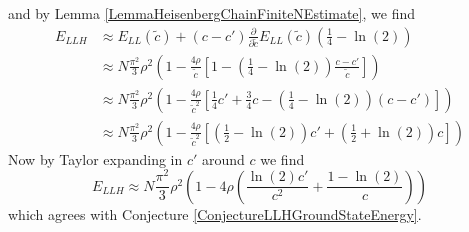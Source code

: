 and by Lemma \ref{LemmaHeisenbergChainFiniteNEstimate}, we find \begin{equation}
\begin{aligned}
E_{LLH}&\approx E_{LL}(\tilde{c})+(c-c')\frac{\partial}{\partial \tilde{c}}E_{LL}(\tilde{c})\left(\frac{1}{4}-\ln(2)\right)\\
&\approx N\frac{\pi^2}{3}\rho^2\left(1-\frac{4\rho}{\tilde{c}}\left[1-\left(\frac{1}{4}-\ln(2)\right)\frac{c-c'}{\tilde{c}}\right]\right)\\
&\approx N\frac{\pi^2}{3}\rho^2\left(1-\frac{4\rho}{\tilde{c}^2}\left[\frac{1}{4}c'+\frac{3}{4}c-\left(\frac{1}{4}-\ln(2)\right)(c-c')\right]\right)\\
&\approx N\frac{\pi^2}{3}\rho^2\left(1-\frac{4\rho}{\tilde{c}^2}\left[\left(\frac{1}{2}-\ln(2)\right)c'+\left(\frac{1}{2}+\ln(2)\right)c\right]\right)
\end{aligned}
\end{equation}
Now by Taylor expanding in $ c' $ around $ c $ we find 
\begin{equation}
	E_{LLH}\approx N\frac{\pi^2}{3}\rho^2\left(1-4\rho\left(\frac{\ln(2)c'}{c^2}+\frac{1-\ln(2)}{c}\right)\right)
\end{equation}
which agrees with Conjecture \ref{ConjectureLLHGroundStateEnergy}.

